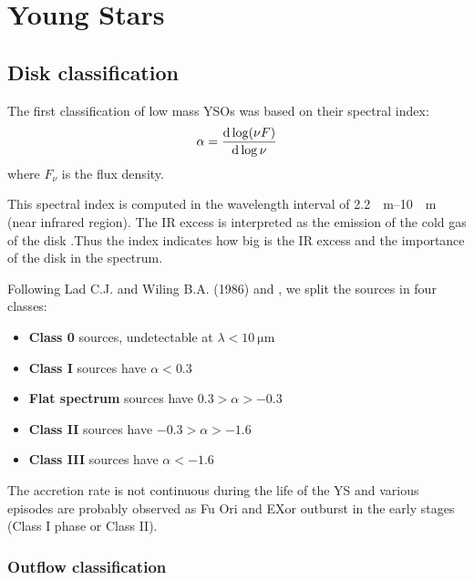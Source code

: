 \documentclass[10pt,a4paper,english]{article}
\begin{document}

\section{Young Stars}

\subsection{Disk classification}
The first classification of low mass YSOs was based on their spectral index:
\begin{equation}
    \alpha = \frac{\mathrm{d} \log (\nu F)}{\mathrm{d} \log \nu}
\end{equation}
where $F_\nu$ is the flux density.

This spectral index is computed in the wavelength interval of
\SIrange{2.2}{10}{\mu\m} (near infrared region). The IR excess is interpreted
as the emission of the cold gas of the disk .Thus the index indicates how big
is the IR excess and the importance of the disk in the spectrum.


Following Lad C.J. and Wiling B.A. (1986) and \cite{1993ApJ...406..122A}, we
split the sources in four classes:
\begin{itemize}
    \item \textbf{Class 0} sources, undetectable at $\lambda < \SI{10}{\micro\m}$
    \item \textbf{Class I} sources have $\alpha < 0.3$
    \item \textbf{Flat spectrum} sources have $0.3 > \alpha > -0.3$
    \item \textbf{Class II} sources have $-0.3 > \alpha > -1.6$
    \item \textbf{Class III} sources have $\alpha < -1.6$
\end{itemize}

The accretion rate is not continuous during the life of the YS and various
episodes are probably observed as Fu Ori and EXor outburst in the early stages
(Class I phase or Class II).


\subsubsection{Outflow classification}
\end{document}
